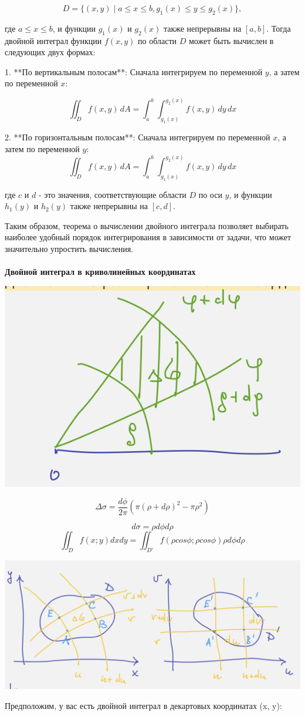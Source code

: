 \documentclass{article}
\begin{document}
\[
D = \{(x, y) \mid a \leq x \leq b, g_1(x) \leq y \leq g_2(x)\},
\]

где $a \leq x \leq b$, и функции $g_1(x)$ и $g_2(x)$ также непрерывны на $[a, b]$. Тогда двойной интеграл функции $f(x, y)$ по области $D$ может быть вычислен в следующих двух формах:

1. **По вертикальным полосам**: Сначала интегрируем по переменной $y$, а затем по переменной $x$:
   
   \[
   \iint_D f(x, y) \, dA = \int_{a}^{b} \int_{g_1(x)}^{g_2(x)} f(x, y) \, dy \, dx
   \]

2. **По горизонтальным полосам**: Сначала интегрируем по переменной $x$, а затем по переменной $y$:
   \[
   \iint_D f(x, y) \, dA = \int_{a}^{b} \int_{g_1(x)}^{g_2(x)} f(x, y) \, dy \, dx
   \]

где $c$ и $d$ - это значения, соответствующие области $D$ по оси $y$, и функции $h_1(y)$ и $h_2(y)$ также непрерывны на $[c, d]$.

Таким образом, теорема о вычислении двойного интеграла позволяет выбирать наиболее удобный порядок интегрирования в зависимости от задачи, что может значительно упростить вычисления.
\\ \\
\textbf{Двойной интеграл в криволинейных координатах}
\begin{center}
    \includegraphics[width=.3\textwidth]{123} 
\end{center}
\begin{equation*}
    \Delta \sigma = \frac{d\phi}{2\pi}(\pi (\rho + d\rho)^2-\pi\rho ^2)
\end{equation*}

\begin{equation*}
    d \sigma = \rho d\phi d\rho
\end{equation*}
\begin{equation*}
    \iint_{D}f(x;y)dxdy=\iint_{D'}f(\rho cos\phi;\rho cos\phi)\rho d\phi d\rho
\end{equation*}
\begin{center}
    \includegraphics[width=.3\textwidth]{krivo.png}
\end{center}
Предположим, у вас есть двойной интеграл в декартовых координатах (x, y):
\end{document}

